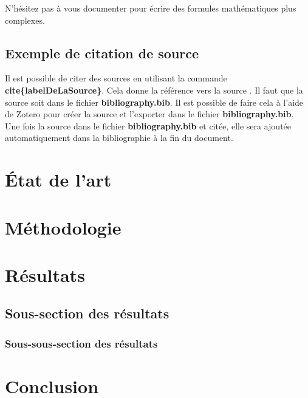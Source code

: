 \documentclass[12pt]{article}
\begin{document}
N'hésitez pas à vous documenter pour écrire des formules mathématiques plus complexes.

\subsection{Exemple de citation de source}

Il est possible de citer des sources en utilisant la commande \textbf{\\cite\{labelDeLaSource\}}.
\newline
Cela donne la référence vers la source \cite{sumpterFittingXGModel}.
\newline
Il faut que la source soit dans le fichier \textbf{bibliography.bib}. Il est possible de faire cela à l'aide de Zotero pour créer la source et l'exporter dans le fichier \textbf{bibliography.bib}.
\newline
Une fois la source dans le fichier \textbf{bibliography.bib} et citée, elle sera ajoutée automatiquement dans la bibliographie à la fin du document.

\section{État de l'art}
\section{Méthodologie}
\section{Résultats}
\subsection{Sous-section des résultats}
\subsubsection{Sous-sous-section des résultats}

\section{Conclusion}




\end{document}
